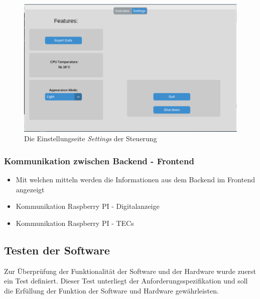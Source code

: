 \begin{figure}
    \centering
    \includegraphics[scale=0.3, trim={1mm 1mm 1mm 2mm},clip]{98_images/settings_window_large.PNG}
    \caption{Die Einstellungseite \textit{Settings} der Steuerung}
    \label{fig:settings_sw}
\end{figure}

\subsubsection{Kommunikation zwischen Backend - Frontend}

\begin{itemize}
    \item Mit welchen mitteln werden die Informationen aus dem Backend im Frontend angezeigt
    \item Kommunikation Raspberry PI - Digitalanzeige
    \item Kommunikation Raspberry PI - TECs
\end{itemize}


\subsection{Testen der Software}
Zur Überprüfung der Funktionalität der Software und der Hardware wurde zuerst ein Test definiert. Dieser Test unterliegt der Anforderungsspezifikation und soll die Erfüllung der Funktion der Software und Hardware gewährleisten.

